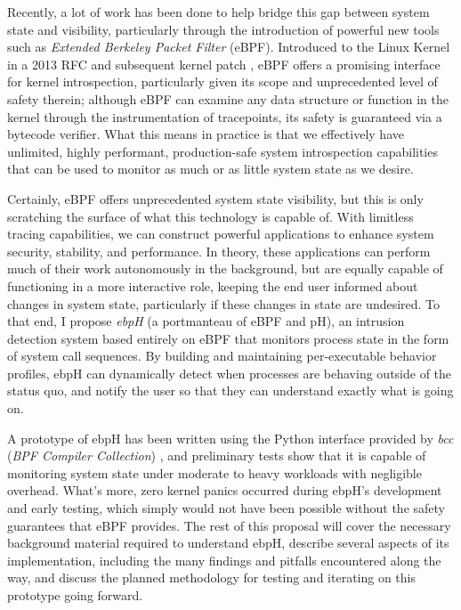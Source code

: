 \documentclass[
  12pt]{findlay}
\begin{document}
Recently, a lot of work has been done to help bridge this gap between
system state and visibility, particularly through the introduction of
powerful new tools such as \emph{Extended Berkeley Packet Filter}
(eBPF). Introduced to the Linux Kernel in a 2013 RFC and subsequent
kernel patch \autocite{starovoitov13}, eBPF offers a promising interface
for kernel introspection, particularly given its scope and unprecedented
level of safety therein; although eBPF can examine any data structure or
function in the kernel through the instrumentation of tracepoints, its
safety is guaranteed via a bytecode verifier. What this means in
practice is that we effectively have unlimited, highly performant,
production-safe system introspection capabilities that can be used to
monitor as much or as little system state as we desire.

Certainly, eBPF offers unprecedented system state visibility, but this
is only scratching the surface of what this technology is capable of.
With limitless tracing capabilities, we can construct powerful
applications to enhance system security, stability, and performance. In
theory, these applications can perform much of their work autonomously
in the background, but are equally capable of functioning in a more
interactive role, keeping the end user informed about changes in system
state, particularly if these changes in state are undesired. To that
end, I propose \emph{ebpH} (a portmanteau of eBPF and pH), an intrusion
detection system based entirely on eBPF that monitors process state in
the form of system call sequences. By building and maintaining
per-executable behavior profiles, ebpH can dynamically detect when
processes are behaving outside of the status quo, and notify the user so
that they can understand exactly what is going on.

A prototype of ebpH has been written using the Python interface provided
by \emph{bcc} (\emph{BPF Compiler Collection}) \autocite{bcc}, and
preliminary tests show that it is capable of monitoring system state
under moderate to heavy workloads with negligible overhead. What's more,
zero kernel panics occurred during ebpH's development and early testing,
which simply would not have been possible without the safety guarantees
that eBPF provides. The rest of this proposal will cover the necessary
background material required to understand ebpH, describe several
aspects of its implementation, including the many findings and pitfalls
encountered along the way, and discuss the planned methodology for
testing and iterating on this prototype going forward.
\end{document}
